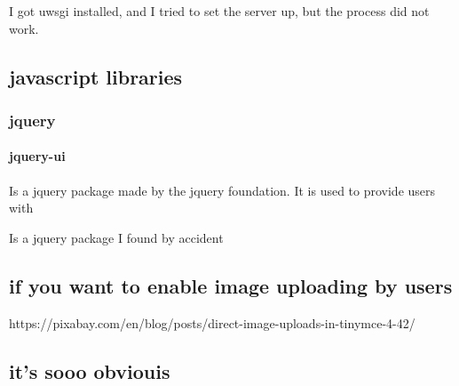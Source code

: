 I got uwsgi installed, and I tried to set the server up, but the process did not work.



\subsection{javascript libraries}

\subsubsection{jquery}

\paragraph{jquery-ui}

Is a jquery package made by the jquery foundation.  It is used to provide users with 


Is a jquery package I found by accident

\subsection{if you want to enable image uploading by users}

https://pixabay.com/en/blog/posts/direct-image-uploads-in-tinymce-4-42/

\subsection{it's sooo obviouis}


